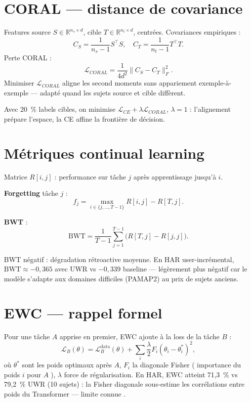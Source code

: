 \documentclass[a4paper,12pt]{report}
\begin{document}
\section{CORAL — distance de covariance}

Features source $S \in \mathbb{R}^{n_s \times d}$, cible $T \in \mathbb{R}^{n_t \times d}$,
centrées. Covariances empiriques :
\[
C_S = \frac{1}{n_s-1} S^\top S, \quad C_T = \frac{1}{n_t-1} T^\top T.
\]
Perte CORAL :
\[
\mathcal{L}_{CORAL} = \frac{1}{4d^2} \| C_S - C_T \|_F^2.
\]
Minimiser $\mathcal{L}_{CORAL}$ aligne les second moments sans appariement
exemple-à-exemple — adapté quand les sujets source et cible diffèrent.

Avec 20~\% labels cibles, on minimise
$\mathcal{L}_{CE} + \lambda \mathcal{L}_{CORAL}$, $\lambda=1$ : l'alignement
prépare l'espace, la CE affine la frontière de décision.

\section{Métriques continual learning}

Matrice $R[i,j]$ : performance sur tâche $j$ après apprentissage jusqu'à $i$.

\textbf{Forgetting} tâche $j$ :
\[
f_j = \max_{i \in \{j,\ldots,T-1\}} R[i,j] - R[T,j].
\]

\textbf{BWT} :
\[
\mathrm{BWT} = \frac{1}{T-1} \sum_{j=1}^{T-1} \big( R[T,j] - R[j,j] \big).
\]

BWT négatif : dégradation rétroactive moyenne. En HAR user-incrémental,
$\mathrm{BWT} \approx -0{,}365$ avec UWR vs $-0{,}339$ baseline — légèrement
plus négatif car le modèle s'adapte aux domaines difficiles (PAMAP2) au prix
de sujets anciens.

\section{EWC — rappel formel}

Pour une tâche $A$ apprise en premier, EWC ajoute à la loss de la tâche $B$ :
\[
\mathcal{L}_B(\theta) = \mathcal{L}_B^{\mathrm{data}}(\theta) +
\sum_i \frac{\lambda}{2} F_i ( \theta_i - \theta_i^* )^2,
\]
où $\theta^*$ sont les poids optimaux après $A$, $F_i$ la diagonale Fisher
( importance du poids $i$ pour $A$ ), $\lambda$ force de régularisation. En HAR,
EWC atteint 71,3~\% vs 79,2~\% UWR (10 sujets) : la Fisher diagonale sous-estime
les corrélations entre poids du Transformer — limite connue \parencite{delange2021}.
\end{document}
